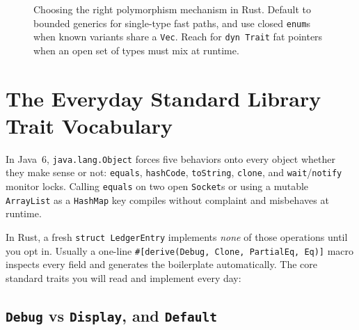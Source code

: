 \begin{figure}[H]
\caption{Choosing the right polymorphism mechanism in Rust. Default to bounded generics for single-type fast paths, and use closed \texttt{enum}s when known variants share a \texttt{Vec}. Reach for \texttt{dyn Trait} fat pointers when an open set of types must mix at runtime.}
\label{ch06:fig-dispatch-architecture-map}
\end{figure}

\section{The Everyday Standard Library Trait Vocabulary}
\label{ch06:std-traits}

In Java~6, \texttt{java.lang.Object} forces five behaviors onto every object whether they make sense or not: \texttt{equals}, \texttt{hashCode}, \texttt{toString}, \texttt{clone}, and \texttt{wait}/\texttt{notify} monitor locks. Calling \texttt{equals} on two open \texttt{Socket}s or using a mutable \texttt{ArrayList} as a \texttt{HashMap} key compiles without complaint and misbehaves at runtime.

In Rust, a fresh \texttt{struct LedgerEntry} implements \emph{none} of those operations until you opt in. Usually a one-line \texttt{\#[derive(Debug, Clone, PartialEq, Eq)]} macro inspects every field and generates the boilerplate automatically. The core standard traits you will read and implement every day:

\subsection{\texttt{Debug} vs \texttt{Display}, and \texttt{Default}}

